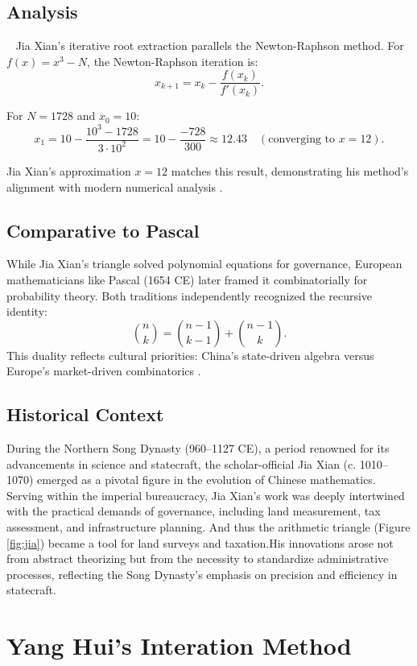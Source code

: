 \documentclass{article}
\begin{document}
\subsection{Analysis}
~
Jia Xian's iterative root extraction parallels the Newton-Raphson method. For \( f(x) = x^3 - N \), the Newton-Raphson iteration is:
\[
x_{k+1} = x_k - \frac{f(x_k)}{f'(x_k)}.
\]

For \( N = 1728 \) and \( x_0 = 10 \):
\[
x_1 = 10 - \frac{10^3 - 1728}{3 \cdot 10^2} = 10 - \frac{-728}{300} \approx 12.43 \quad (\text{converging to } x = 12).
\]

Jia Xian’s approximation \( x = 12 \) matches this result, demonstrating his method’s alignment with modern numerical analysis 
\cite{lam1986}.

\subsection{Comparative to Pascal}

While Jia Xian’s triangle solved polynomial equations for governance, European mathematicians like Pascal (1654 CE) later framed it combinatorially for probability theory. Both traditions independently recognized the recursive identity:
\[
\binom{n}{k} = \binom{n-1}{k-1} + \binom{n-1}{k}.
\]
This duality reflects cultural priorities: China’s state-driven algebra versus Europe’s market-driven combinatorics \cite{boyer1950, hinz1992}.

\subsection{Historical Context}
During the Northern Song Dynasty (960–1127 CE), a period renowned for its advancements in science and statecraft, the scholar-official Jia Xian (c. 1010–1070) emerged as a pivotal figure in the evolution of Chinese mathematics. Serving within the imperial bureaucracy, Jia Xian’s work was deeply intertwined with the practical demands of governance, including land measurement, tax assessment, and infrastructure planning. And thus the arithmetic triangle (Figure \ref{fig:jia}) became a tool for land surveys and taxation.His innovations arose not from abstract theorizing but from the necessity to standardize administrative processes, reflecting the Song Dynasty’s emphasis on precision and efficiency in statecraft.


\section{Yang Hui’s Interation Method}
\end{document}
